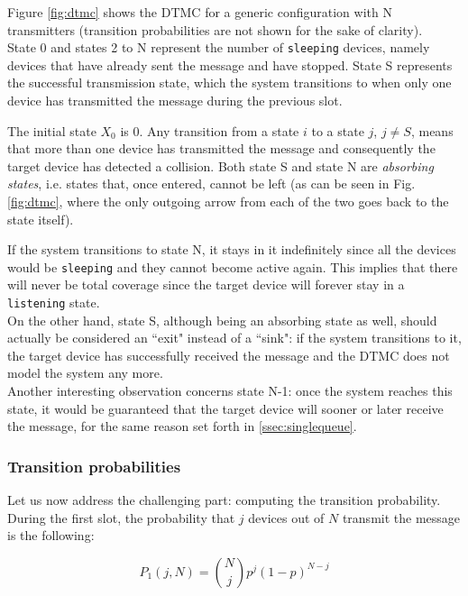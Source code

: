 \noindent Figure \ref{fig:dtmc} shows the DTMC for a generic configuration with N transmitters (transition probabilities are not shown for the sake of clarity).\\
State 0 and states 2 to N represent the number of \texttt{sleeping} devices, namely devices that have already sent the message and have stopped. 
State S represents the successful transmission state, which the system transitions to when only one device has transmitted the message during the previous slot.

The initial state $X_{0}$ is 0. Any transition from a state $i$ to a state $j$, $j \neq S$, means that more than one device has transmitted the message and consequently the target device has detected a collision.
Both state S and state N are \textit{absorbing states}, i.e. states that, once entered, cannot be left (as can be seen in Fig. \ref{fig:dtmc}, where the only outgoing arrow from each of the two goes back to the state itself).

If the system transitions to state N, it stays in it indefinitely since all the devices would be \texttt{sleeping} and they cannot become active again. This implies that there will never be total coverage since the target device will forever stay in a \texttt{listening} state.\\
On the other hand, state S, although being an absorbing state as well, should actually be considered an ``exit" instead of a ``sink": if the system transitions to it, the target device has successfully received the message and the DTMC does not model the system any more.\\
Another interesting observation concerns state N-1: once the system reaches this state, it would be guaranteed that the target device will sooner or later receive the message, for the same reason set forth in \ref{ssec:singlequeue}.

\subsubsection{Transition probabilities}

Let us now address the challenging part: computing the transition probability.
\hfill \break
During the first slot, the probability that $j$ devices out of $N$ transmit the message is the following:

\begin{equation}
	P_{1}(j, N) = {N\choose j} p^{j} (1-p)^{N-j}
	\label{eq:firstSlotTransProb}
\end{equation}

